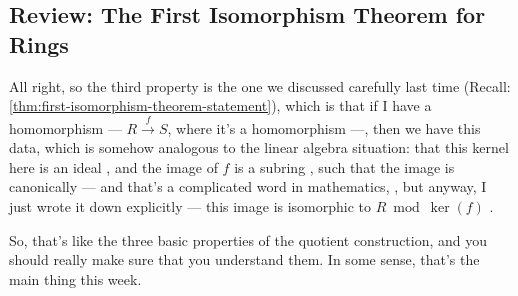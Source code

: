 \begin{hidden}
\end{hidden}

\subsection{Review: The First Isomorphism Theorem for Rings}

\begin{speech}[00:07:05 - 00:08:15]
All right, so the third property is the one we discussed carefully last time (Recall: \cref{thm:first-isomorphism-theorem-statement}), which is that if I have a homomorphism  --- $R \xrightarrow{f} S$, where it's a homomorphism ---, then we have this data, which is somehow analogous to the linear algebra situation: that this kernel here is an ideal , and the image of $f$ is a subring , such that the image is canonically --- and that's a complicated word in mathematics, , but anyway, I just wrote it down explicitly --- this image is isomorphic to $R \bmod \ker(f)$ .

So, that's like the three basic properties of the quotient construction, and you should really make sure that you understand them. In some sense, that's the main thing this week.
\end{speech}

